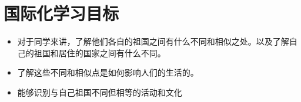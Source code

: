\chapter{国际化学习目标}


\begin{itemize}
  \item 对于同学来讲，了解他们各自的祖国之间有什么不同和相似之处。以及了解自己的祖国和居住的国家之间有什么不同。
  \item 了解这些不同和相似点是如何影响人们的生活的。
  \item 能够识别与自己祖国不同但相等的活动和文化 
\end{itemize}
